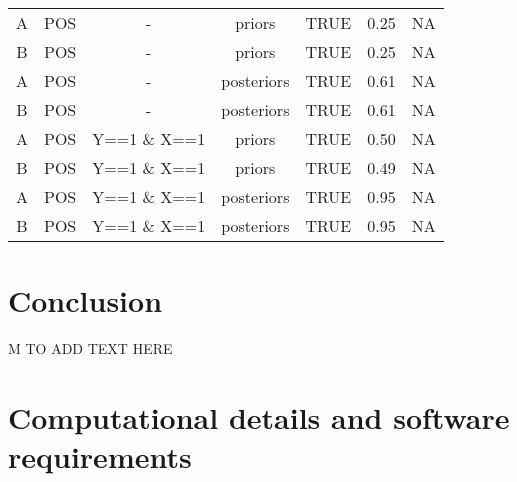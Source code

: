 \documentclass[
  11pt,
  article]{jss}
\begin{document}
\begin{longtable}[t]{ccccccc}
A & POS & - & priors & TRUE & 0.25 & NA\\
\addlinespace
B & POS & - & priors & TRUE & 0.25 & NA\\
A & POS & - & posteriors & TRUE & 0.61 & NA\\
B & POS & - & posteriors & TRUE & 0.61 & NA\\
A & POS & Y==1 \& X==1 & priors & TRUE & 0.50 & NA\\
B & POS & Y==1 \& X==1 & priors & TRUE & 0.49 & NA\\
\addlinespace
A & POS & Y==1 \& X==1 & posteriors & TRUE & 0.95 & NA\\
B & POS & Y==1 \& X==1 & posteriors & TRUE & 0.95 & NA\\
\bottomrule

\end{longtable}

\section{Conclusion}\label{conclusion}

M TO ADD TEXT HERE

\FloatBarrier

\newpage{}

\section*{Computational details and software
requirements}\label{computational-details-and-software-requirements}
\end{document}
